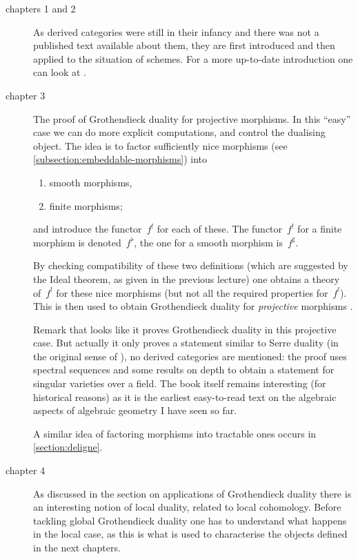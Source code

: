 \documentclass[10pt,a4paper]{article}
\begin{document}
\begin{description}
  \item[chapters 1 and 2] As derived categories were still in their infancy and there was not a published text available about them, they are first introduced and then applied to the situation of schemes. For a more up-to-date introduction one can look at \cite[chapters 1--3]{huybrechts-fourier-mukai-transforms}.
  \item[chapter 3] The proof of Grothendieck duality for projective morphisms. In this ``easy'' case we can do more explicit computations, and control the dualising object. The idea is to factor sufficiently nice morphisms (see \cref{subsection:embeddable-morphisms}) into
    \begin{enumerate}
      \item smooth morphisms,
      \item finite morphisms;
    \end{enumerate}
    and introduce the functor~$f^!$ for each of these. The functor~$f^!$ for a finite morphism is denoted~$f^\flat$, the one for a smooth morphism is~$f^\sharp$.
    
    By checking compatibility of these two definitions (which are suggested by the Ideal theorem, as given in the previous lecture) one obtains a theory of~$f^!$ for these nice morphisms \cite[theorem III.8.7]{hartshorne-residues-and-duality} (but not all the required properties for~$f^!$). This is then used to obtain Grothendieck duality for \emph{projective} morphisms \cite[\S III.9, III.10]{hartshorne-residues-and-duality}.

    Remark that \cite{altman-kleiman-grothendieck-duality} looks like it proves Grothendieck duality in this projective case. But actually it only proves a statement similar to Serre duality (in the original sense of \cite{serre-faisceaux-algebriques-coherents}), no derived categories are mentioned: the proof uses spectral sequences and some results on depth to obtain a statement for singular varieties over a field. The book itself remains interesting (for historical reasons) as it is the earliest easy-to-read text on the algebraic aspects of algebraic geometry I have seen so far.

    A similar idea of factoring morphisms into tractable ones occurs in \cref{section:deligne}.

  \item[chapter 4] As discussed in the section on applications of Grothendieck duality there is an interesting notion of local duality, related to local cohomology. Before tackling global Grothendieck duality one has to understand what happens in the local case, as this is what is used to characterise the objects defined in the next chapters.


\end{description}
\end{document}
